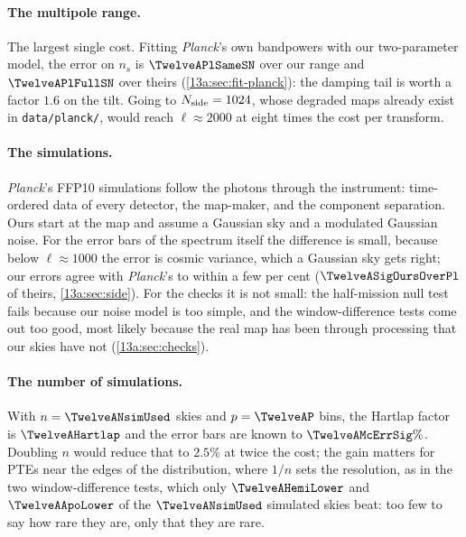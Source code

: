 \paragraph{The multipole range.} The largest single cost. Fitting \textit{Planck}'s own bandpowers with our two-parameter model, the
error on $n_s$ is $\TwelveAPlSameSN$ over our range and $\TwelveAPlFullSN$ over theirs (\cref{13a:sec:fit-planck}): the damping tail is
worth a factor $1.6$ on the tilt. Going to $N_{\rm side}=1024$, whose degraded maps already exist in \texttt{data/planck/}, would reach
$\ell\approx2000$ at eight times the cost per transform.

\paragraph{The simulations.} \textit{Planck}'s FFP10 simulations follow the photons through the instrument: time-ordered data
of every detector, the map-maker, and the component separation. Ours start at the map and assume a Gaussian sky and a modulated
Gaussian noise. For the error bars of the spectrum itself the difference is small, because below $\ell\approx1000$ the error is cosmic
variance, which a Gaussian sky gets right; our errors agree with \textit{Planck}'s to within a few per cent
($\TwelveASigOursOverPl$ of theirs, \cref{13a:sec:side}). For the checks it is not small: the half-mission null test fails
because our noise model is too simple, and the window-difference tests come out too good, most likely because the real map has
been through processing that our skies have not (\cref{13a:sec:checks}).

\paragraph{The number of simulations.} With $n=\TwelveANsimUsed$ skies and $p=\TwelveAP$ bins, the Hartlap factor is $\TwelveAHartlap$ and the
error bars are known to $\TwelveAMcErrSig\%$. Doubling $n$ would reduce that to $2.5\%$ at twice the cost; the gain matters for PTEs near the
edges of the distribution, where $1/n$ sets the resolution, as in the two window-difference tests, which only $\TwelveAHemiLower$ and
$\TwelveAApoLower$ of the $\TwelveANsimUsed$ simulated skies beat: too few to say how rare they are, only that they are rare.

